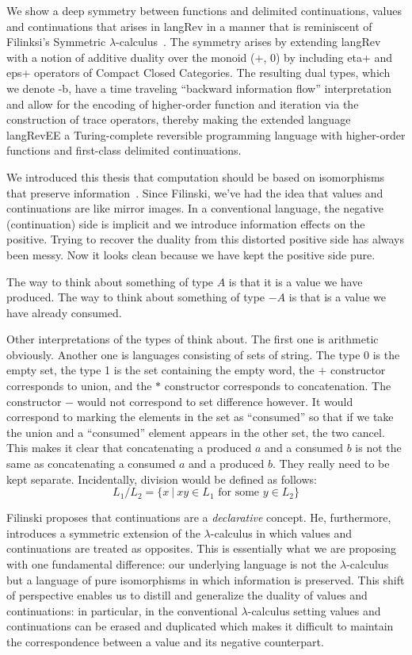 \documentclass[preprint]{sigplanconf}
\newcommand{\lcal}{\ensuremath{\lambda}-calculus}
\begin{document}
{We show a deep symmetry between functions and delimited continuations, values
and continuations that arises in {{langRev}} in a manner that is reminiscent
of Filinksi's Symmetric \lcal ~\cite{Filinski:1989:DCI:648332.755574}. The
symmetry arises by extending {{langRev}} with a notion of additive duality
over the monoid {{(+, 0)}} by including {{eta+}} and {{eps+}} operators of
Compact Closed Categories. The resulting dual types, which we denote {{-b}},
have a time traveling ``backward information flow'' interpretation and allow
for the encoding of higher-order function and iteration via the construction
of trace operators, thereby making the extended language {{langRevEE}} a
Turing-complete reversible programming language with higher-order functions
and first-class delimited continuations.

We introduced this thesis that computation should be based on isomorphisms
that preserve information~\cite{infeffects}. Since Filinski, we've had the
idea that values and continuations are like mirror images. In a conventional
language, the negative (continuation) side is implicit and we introduce
information effects on the positive. Trying to recover the duality from this
distorted positive side has always been messy. Now it looks clean because we
have kept the positive side pure.

The way to think about something of type $A$ is that it is a value we have
produced. The way to think about something of type $-A$ is that is a value we
have already consumed. 

Other interpretations of the types of think about. The first one is
arithmetic obviously. Another one is languages consisting of sets of
string. The type 0 is the empty set, the type 1 is the set containing the
empty word, the $+$ constructor corresponds to union, and the $*$ constructor
corresponds to concatenation. The constructor $-$ would not correspond to set
difference however. It would correspond to marking the elements in the set as
``consumed'' so that if we take the union and a ``consumed'' element appears
in the other set, the two cancel. This makes it clear that concatenating a
produced $a$ and a consumed $b$ is not the same as concatenating a consumed
$a$ and a produced $b$. They really need to be kept separate. Incidentally,
division would be defined as follows:
\[
L_1 / L_2 = \{ x ~|~ xy \in L_1 \mbox{~for~some~} y \in L_2 \}
\]

Filinski proposes that continuations are a \emph{declarative} concept. He,
furthermore, introduces a symmetric extension of the $\lambda$-calculus in
which values and continuations are treated as opposites. This is essentially
what we are proposing with one fundamental difference: our underlying
language is not the $\lambda$-calculus but a language of pure isomorphisms in
which information is preserved. This shift of perspective enables us to
distill and generalize the duality of values and continuations: in
particular, in the conventional $\lambda$-calculus setting values and
continuations can be erased and duplicated which makes it difficult to
maintain the correspondence between a value and its negative counterpart.

}
\end{document}
